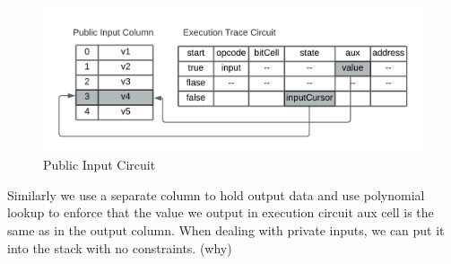 \begin{figure}[!ht]
\centerline{
\includegraphics[scale=0.8]{figs/public-input.png}
}
\caption{Public Input Circuit}\label{fig:public-input}
\end{figure}
 Similarly we use a separate column to hold output data and use polynomial lookup to enforce that the value we output in execution circuit aux cell is the same as in the output column. When dealing with private inputs, we can put it into the stack with no constraints. (why)